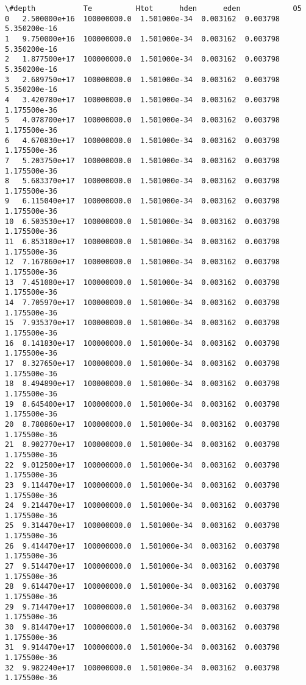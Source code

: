 \documentclass[11pt]{article}
\makeatletter
\newcommand{\boxspacing}{\kern\kvtcb@left@rule\kern\kvtcb@boxsep}
\newcommand{\prompt}[4]{
        \ttfamily\llap{{\color{#2}[#3]:\hspace{3pt}#4}}\vspace{-\baselineskip}
    }
\makeatother
\begin{document}
            \begin{tcolorbox}[breakable, size=fbox, boxrule=.5pt, pad at break*=1mm, opacityfill=0]
\prompt{Out}{outcolor}{212}{\boxspacing}
\begin{Verbatim}[commandchars=\\\{\}]
          \#depth           Te          Htot      hden      eden            O5
0   2.500000e+16  100000000.0  1.501000e-34  0.003162  0.003798  5.350200e-16
1   9.750000e+16  100000000.0  1.501000e-34  0.003162  0.003798  5.350200e-16
2   1.877500e+17  100000000.0  1.501000e-34  0.003162  0.003798  5.350200e-16
3   2.689750e+17  100000000.0  1.501000e-34  0.003162  0.003798  5.350200e-16
4   3.420780e+17  100000000.0  1.501000e-34  0.003162  0.003798  1.175500e-36
5   4.078700e+17  100000000.0  1.501000e-34  0.003162  0.003798  1.175500e-36
6   4.670830e+17  100000000.0  1.501000e-34  0.003162  0.003798  1.175500e-36
7   5.203750e+17  100000000.0  1.501000e-34  0.003162  0.003798  1.175500e-36
8   5.683370e+17  100000000.0  1.501000e-34  0.003162  0.003798  1.175500e-36
9   6.115040e+17  100000000.0  1.501000e-34  0.003162  0.003798  1.175500e-36
10  6.503530e+17  100000000.0  1.501000e-34  0.003162  0.003798  1.175500e-36
11  6.853180e+17  100000000.0  1.501000e-34  0.003162  0.003798  1.175500e-36
12  7.167860e+17  100000000.0  1.501000e-34  0.003162  0.003798  1.175500e-36
13  7.451080e+17  100000000.0  1.501000e-34  0.003162  0.003798  1.175500e-36
14  7.705970e+17  100000000.0  1.501000e-34  0.003162  0.003798  1.175500e-36
15  7.935370e+17  100000000.0  1.501000e-34  0.003162  0.003798  1.175500e-36
16  8.141830e+17  100000000.0  1.501000e-34  0.003162  0.003798  1.175500e-36
17  8.327650e+17  100000000.0  1.501000e-34  0.003162  0.003798  1.175500e-36
18  8.494890e+17  100000000.0  1.501000e-34  0.003162  0.003798  1.175500e-36
19  8.645400e+17  100000000.0  1.501000e-34  0.003162  0.003798  1.175500e-36
20  8.780860e+17  100000000.0  1.501000e-34  0.003162  0.003798  1.175500e-36
21  8.902770e+17  100000000.0  1.501000e-34  0.003162  0.003798  1.175500e-36
22  9.012500e+17  100000000.0  1.501000e-34  0.003162  0.003798  1.175500e-36
23  9.114470e+17  100000000.0  1.501000e-34  0.003162  0.003798  1.175500e-36
24  9.214470e+17  100000000.0  1.501000e-34  0.003162  0.003798  1.175500e-36
25  9.314470e+17  100000000.0  1.501000e-34  0.003162  0.003798  1.175500e-36
26  9.414470e+17  100000000.0  1.501000e-34  0.003162  0.003798  1.175500e-36
27  9.514470e+17  100000000.0  1.501000e-34  0.003162  0.003798  1.175500e-36
28  9.614470e+17  100000000.0  1.501000e-34  0.003162  0.003798  1.175500e-36
29  9.714470e+17  100000000.0  1.501000e-34  0.003162  0.003798  1.175500e-36
30  9.814470e+17  100000000.0  1.501000e-34  0.003162  0.003798  1.175500e-36
31  9.914470e+17  100000000.0  1.501000e-34  0.003162  0.003798  1.175500e-36
32  9.982240e+17  100000000.0  1.501000e-34  0.003162  0.003798  1.175500e-36
\end{Verbatim}
\end{tcolorbox}
        
\end{document}
